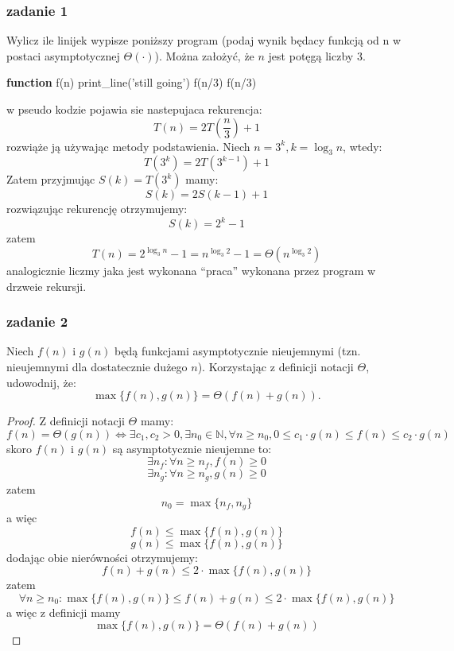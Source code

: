 \documentclass[11pt,a4paper]{article}
\begin{document}
\subsubsection{zadanie 1}
Wylicz ile linijek wypisze poniższy program (podaj wynik będacy funkcją od n w postaci asymptotycznej $\Theta(\cdot)$). Można założyć, że $n$ jest potęgą liczby $3$.
\begin{algorithm}
\begin{algorithmic}[1]
\State \textbf{function} f(n)
    \State print\_line('still going')
    \State f(n/3)
    \State f(n/3)
\EndIf
\end{algorithmic}
\end{algorithm}
w pseudo kodzie pojawia sie nastepujaca rekurencja:
\[
    T(n) = 2T(\frac{n}{3}) + 1
\]
rozwiąże ją używając metody podstawienia. Niech $n=3^k, k = \log_3 n$, wtedy:
\[
    T(3^k) = 2T(3^{k-1}) + 1
\]
Zatem przyjmując $S(k) = T(3^k)$ mamy:
\[
    S(k) = 2S(k-1) + 1
\]
rozwiązując rekurencję otrzymujemy:
\[
    S(k) = 2^k - 1
\]
zatem
\[
    T(n) = 2^{\log_3 n} - 1 = n^{\log_3 2} - 1 = \Theta(n^{\log_3 2})
\]
analogicznie liczmy jaka jest wykonana ``praca'' wykonana przez program w drzweie rekursji.

\subsubsection{zadanie 2}
Niech $f(n)$ i $g(n)$ będą funkcjami asymptotycznie nieujemnymi (tzn. nieujemnymi dla dostatecznie dużego $n$). Korzystając z definicji notacji $\Theta$, udowodnij, że:
\[
\max\{f(n), g(n)\} = \Theta(f(n) + g(n)).
\]
\begin{proof}
    Z definicji notacji $\Theta$ mamy:
    \[
        f(n)=\Theta(g(n)) \iff \exists c_1, c_2 > 0, \exists n_0 \in \mathbb{N}, \forall n \geq n_0, 0 \leq c_1 \cdot g(n) \leq f(n) \leq c_2 \cdot g(n)
    \]
    skoro $f(n)$ i $g(n)$ są asymptotycznie nieujemne to:
    \[
        \exists n_f: \forall n \geq n_f, f(n) \geq 0
    \]
    \[
        \exists n_g: \forall n \geq n_g, g(n) \geq 0
    \]
    zatem
    \[
        n_0=\max\{n_f, n_g\}
    \]
    a więc
    \[
        f(n) \leq \max\{f(n), g(n)\}
    \]
    \[
        g(n) \leq \max\{f(n), g(n)\}
    \]
    dodając obie nierówności otrzymujemy:
    \[
        f(n) + g(n) \leq 2 \cdot \max\{f(n), g(n)\}
    \]
    zatem
    \[
        \forall n \geq n_0: \max\{f(n), g(n)\} \leq f(n) + g(n) \leq 2 \cdot \max\{f(n), g(n)\}
    \]
    a więc z definicji mamy
    \[
        \max\{f(n), g(n)\} = \Theta(f(n) + g(n))
    \]
\end{proof}
\end{document}
